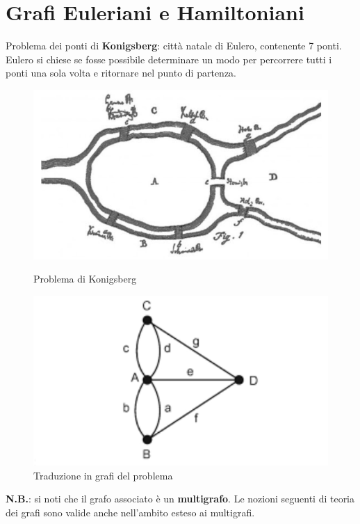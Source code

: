 \section{Grafi Euleriani e Hamiltoniani}
\begin{flushleft}
    Problema dei ponti di \textbf{Konigsberg}: città natale di Eulero, contenente 7 ponti. Eulero si chiese se fosse possibile determinare un modo per percorrere tutti i ponti una sola volta e ritornare nel punto di partenza.

    \begin{figure}[h]
        \centering
        \begin{minipage}[t]{0.45\textwidth}
            \centering
            \includegraphics[width=\textwidth]{img/kon_1}
            \caption{Problema di Konigsberg}
        \end{minipage}
        \begin{minipage}[t]{0.45\textwidth}
            \centering
            \includegraphics[width=\textwidth]{img/kon_2}
            \caption{Traduzione in grafi del problema}
        \end{minipage}
    \end{figure}
    \textbf{N.B.}: si noti che il grafo associato è un \textbf{multigrafo}. Le nozioni seguenti di teoria dei grafi sono valide anche nell'ambito esteso ai multigrafi.


\end{flushleft}
